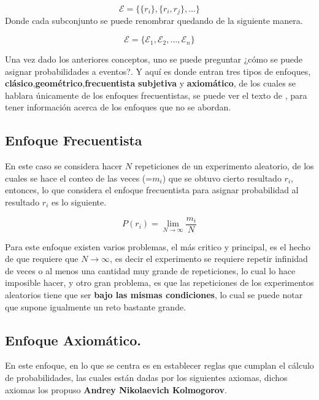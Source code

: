 \begin{equation*}
    \mathcal{E} = \{\{r_i\},\{r_i,r_j\},\dots\}
\end{equation*}
Donde cada subconjunto se puede renombrar quedando de la siguiente manera.

\begin{equation*}
    \mathcal{E} = \{\mathcal{E}_1,\mathcal{E}_2,\dots,\mathcal{E}_n\}
\end{equation*}

Una vez dado los anteriores conceptos, uno se puede preguntar ¿cómo se puede asignar probabilidades a eventos?. Y aquí es donde entran tres tipos de enfoques, \textbf{clásico},\textbf{geométrico},\textbf{frecuentista} \textbf{subjetiva} y  \textbf{axiomático}, de los cuales se hablara únicamente de los enfoques frecuentistas, se puede ver el texto de \cite{RinconIntro}, para tener información acerca de los enfoques que no se abordan.

\subsection{Enfoque Frecuentista}

En este caso se considera hacer $N$ repeticiones de un experimento aleatorio, de los cuales se hace el conteo de las veces (=$m_i$) que se obtuvo cierto resultado $r_i$, entonces, lo que considera el enfoque frecuentista para asignar probabilidad al resultado $r_i$ es lo siguiente.

\begin{equation*}
    P(r_i) = \lim_{N\to \infty}\frac{m_i}{N}
\end{equation*}

Para este enfoque existen varios problemas, el más critico y principal, es el hecho de que requiere que $N\to \infty$, es decir el experimento se requiere repetir infinidad de veces o al menos una cantidad muy grande de repeticiones, lo cual lo hace imposible hacer, y otro gran problema, es que las repeticiones de los experimentos aleatorios tiene que ser \textbf{bajo las mismas condiciones}, lo cual se puede notar que supone igualmente un reto bastante grande.

\subsection{Enfoque Axiomático.}

En este enfoque, en lo que se centra es en establecer reglas que cumplan el cálculo de probabilidades, las cuales están dadas por los siguientes axiomas, dichos axiomas los propuso \textbf{Andrey Nikolaevich Kolmogorov}.



